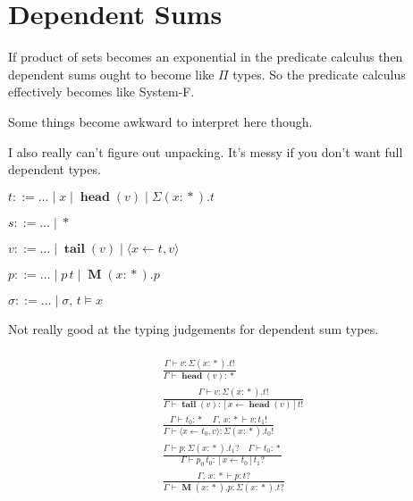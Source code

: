 \documentclass[twocolumn]{scrartcl}
\newcommand{\bnfdef}{\mathbin{::=}}
\DeclareMathOperator{\prop}{*}
\DeclareMathOperator{\head}{\textbf{head}}
\DeclareMathOperator{\tail}{\textbf{tail}}
\DeclareMathOperator{\Mu}{\textbf{M}}
\DeclareMathOperator{\update}{\leftarrow}
\begin{document}
\section*{Dependent Sums}

If product of sets becomes an exponential in the predicate calculus
then dependent sums ought to become like \(\Pi\) types.  So the
predicate calculus effectively becomes like System-F.

Some things become awkward to interpret here though.

I also really can't figure out unpacking. It's messy if you don't want
full dependent types.

\begin{description}[nosep]
\item[Types] \hfill \( t \bnfdef \ldots \mid x \mid \head(v) \mid \Sigma (x \colon \prop). t \)
\item[Sorts] \hfill \( s \bnfdef \ldots \mid \prop \)
\item[Values] \hfill \( v \bnfdef \ldots \mid \tail(v) \mid \langle x \update t , v \rangle \)
\item[Predicates] \hfill \( p \bnfdef \ldots \mid p \, t \mid \Mu (x \colon \prop). p \)
\item[Substitutions] \hfill \( \sigma \bnfdef \ldots \mid \sigma , \, t \models x \)
\end{description}

Not really good at the typing judgements for dependent sum types.

\begin{multline*}
  \\
\frac{
  \Gamma \vdash v \colon \Sigma (x \colon \prop). t !
}{
  \Gamma \vdash \head(v) \colon \prop
}\\
\frac{
  \Gamma \vdash v \colon \Sigma (x \colon \prop). t !
}{
  \Gamma \vdash \tail(v) \colon [x \update \head(v)] t !
}\\
\frac{
  \Gamma \vdash t_0 \colon \prop \quad
  \Gamma , \, x \colon \prop \vdash v \colon t_1 !
}{
  \Gamma \vdash \langle x \update t_0 , v \rangle \colon \Sigma (x \colon \prop). t_0 !
}\\
\frac{
  \Gamma \vdash p \colon \Sigma (x\colon \prop). t_1 ? \quad
  \Gamma \vdash t_0 \colon \prop
}{
  \Gamma \vdash p_0 \, t_0 \colon [x \update t_0] t_1 ?
}\\
\frac{
  \Gamma , \, x \colon \prop \vdash p \colon t ?
}{
  \Gamma \vdash \Mu (x \colon \prop). p \colon \Sigma (x\colon \prop). t ?
}\\
\end{multline*}
\end{document}
